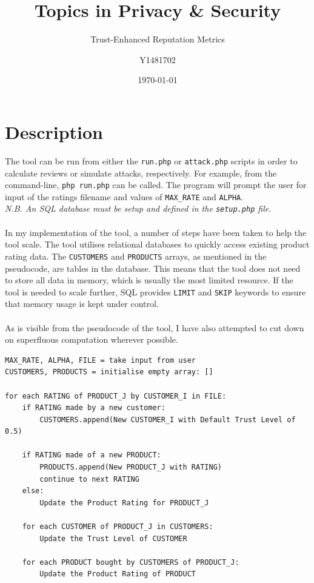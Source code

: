 \documentclass{article}
\title{Topics in Privacy \& Security}
\subtitle{Trust-Enhanced Reputation Metrics}
\author{Y1481702}
\date{\today}
\begin{document}
\begin{titlepage}
\clearpage
\maketitle
\thispagestyle{empty}
\tableofcontents
\end{titlepage}



\section{Description} %
The tool can be run from either the \texttt{run.php} or \texttt{attack.php} scripts in order to calculate reviews or simulate attacks, respectively. For example, from the command-line, \texttt{php run.php} can be called. The program will prompt the user for input of the ratings filename and values of \texttt{MAX\_RATE} and \texttt{ALPHA}.
\\
\textit{N.B. An SQL database must be setup and defined in the \texttt{setup.php} file.}
\\\\
In my implementation of the tool, a number of steps have been taken to help the tool scale.
The tool utilises relational databases to quickly access existing product rating data. The \texttt{CUSTOMERS} and \texttt{PRODUCTS} arrays, as mentioned in the pseudocode, are tables in the database. This means that the tool does not need to store all data in memory, which is usually the most limited resource.
If the tool is needed to scale further, SQL provides \texttt{LIMIT} and \texttt{SKIP} keywords to ensure that memory usage is kept under control.
\\\\
As is visible from the pseudocode of the tool, I have also attempted to cut down on superfluous computation wherever possible.
\begin{lstlisting}
MAX_RATE, ALPHA, FILE = take input from user
CUSTOMERS, PRODUCTS = initialise empty array: []

for each RATING of PRODUCT_J by CUSTOMER_I in FILE:
	if RATING made by a new customer:
		CUSTOMERS.append(New CUSTOMER_I with Default Trust Level of 0.5)

	if RATING made of a new PRODUCT:
		PRODUCTS.append(New PRODUCT_J with RATING)
		continue to next RATING
	else:
		Update the Product Rating for PRODUCT_J

	for each CUSTOMER of PRODUCT_J in CUSTOMERS:
		Update the Trust Level of CUSTOMER

	for each PRODUCT bought by CUSTOMERS of PRODUCT_J:
		Update the Product Rating of PRODUCT

\end{lstlisting}
\end{document}
